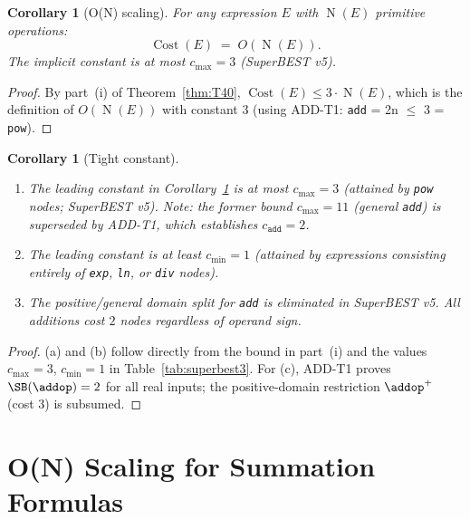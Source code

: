 \documentclass[12pt,a4paper]{article}
\newtheorem{corollary}[theorem]{Corollary}
\theoremstyle{definition}
\newcommand{\Cost}{\operatorname{Cost}}
\newcommand{\NOp}{\operatorname{N}}
\begin{document}
\begin{corollary}[O(N) scaling]
\label{cor:ON}
For any expression $E$ with $\NOp(E)$ primitive operations:
\[
  \Cost(E) \;=\; O\!\left(\NOp(E)\right).
\]
The implicit constant is at most $c_{\max} = 3$ (SuperBEST v5).
\end{corollary}

\begin{proof}
By part~(i) of Theorem~\ref{thm:T40},
$\Cost(E) \leq 3 \cdot \NOp(E)$, which is the definition of
$O(\NOp(E))$ with constant $3$ (using ADD-T1: \texttt{add} = 2n $\leq$ 3 = \texttt{pow}).
\end{proof}

\begin{corollary}[Tight constant]
\label{cor:tight}
\begin{enumerate}
  \item[\textup{(a)}] The leading constant in Corollary~\ref{cor:ON} is at most
        $c_{\max} = 3$ (attained by \texttt{pow} nodes; SuperBEST v5).
        \emph{Note:} the former bound $c_{\max} = 11$ (general \texttt{add})
        is superseded by ADD-T1, which establishes $c_{\texttt{add}} = 2$.
  \item[\textup{(b)}] The leading constant is at least $c_{\min} = 1$ (attained
        by expressions consisting entirely of \texttt{exp}, \texttt{ln}, or
        \texttt{div} nodes).
  \item[\textup{(c)}] The positive/general domain split for \texttt{add} is
        eliminated in SuperBEST v5.  All additions cost $2$ nodes regardless
        of operand sign.
\end{enumerate}
\end{corollary}

\begin{proof}
(a) and (b) follow directly from the bound in part~(i) and the values
$c_{\max} = 3$, $c_{\min} = 1$ in Table~\ref{tab:superbest3}.
For (c), ADD-T1 proves $\SB(\addop) = 2$ for all real inputs; the positive-domain
restriction $\addop^+$ (cost 3) is subsumed.
\end{proof}

\section{O(N) Scaling for Summation Formulas}
\label{sec:scaling}
\end{document}
